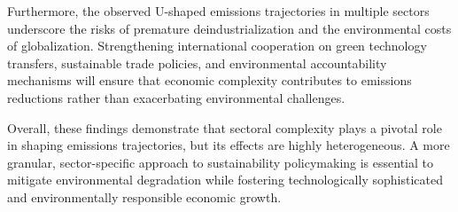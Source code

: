 \documentclass[10pt]{article}
\begin{document}
Furthermore, the observed U-shaped emissions trajectories in multiple sectors underscore the risks of premature deindustrialization and the environmental costs of globalization. Strengthening international cooperation on green technology transfers, sustainable trade policies, and environmental accountability mechanisms will ensure that economic complexity contributes to emissions reductions rather than exacerbating environmental challenges.

Overall, these findings demonstrate that sectoral complexity plays a pivotal role in shaping emissions trajectories, but its effects are highly heterogeneous. A more granular, sector-specific approach to sustainability policymaking is essential to mitigate environmental degradation while fostering technologically sophisticated and environmentally responsible economic growth.
\end{document}

